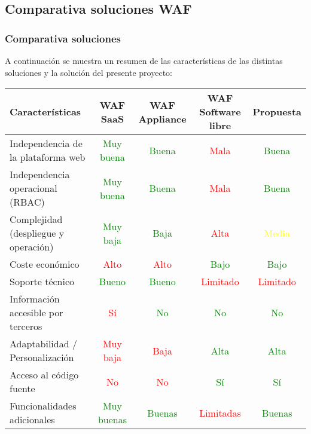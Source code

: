 \subsection{Comparativa soluciones WAF}

\begin{frame}[shrink,c]
  \frametitle{Comparativa soluciones}
  A continuación se muestra un resumen de las características de las distintas soluciones y la solución del presente proyecto:
  \begin{center}
  \resizebox{\linewidth}{!} {
  \begin{tabular}{| l | c | c | c | c |}
    \hline
    {\bf Características}                       &	{\bf WAF SaaS}          & {\bf WAF Appliance} & {\bf WAF Software libre}  & {\bf Propuesta}       \\
    \hline
    Independencia de la plataforma web  & \textcolor{green}{Muy buena}& \textcolor{green}{Buena}& \textcolor{red}{Mala}& \textcolor{green}{Buena}\\
    \hline
    Independencia operacional (RBAC)    & \textcolor{green}{Muy buena}& \textcolor{green}{Buena}& \textcolor{red}{Mala}& \textcolor{green}{Buena}\\
    \hline
    Complejidad (despliegue y operación)& \textcolor{green}{Muy baja}& \textcolor{green}{Baja}& \textcolor{red}{Alta}& \textcolor{yellow}{Media}\\
    \hline
    Coste económico                     & \textcolor{red}{Alto}& \textcolor{red}{Alto}& \textcolor{green}{Bajo}& \textcolor{green}{Bajo}\\
    \hline
    Soporte técnico                     & \textcolor{green}{Bueno}& \textcolor{green}{Bueno}& \textcolor{red}{Limitado}& \textcolor{red}{Limitado}\\
    \hline
    Información accesible por terceros  & \textcolor{red}{Sí}& \textcolor{green}{No}& \textcolor{green}{No}& \textcolor{green}{No}\\ 
    \hline
    Adaptabilidad / Personalización     & \textcolor{red}{Muy baja}& \textcolor{red}{Baja}& \textcolor{green}{Alta}& \textcolor{green}{Alta}\\ 
    \hline
    Acceso al código fuente             & \textcolor{red}{No}& \textcolor{red}{No}& \textcolor{green}{Sí}   & \textcolor{green}{Sí}   \\ 
    \hline
    Funcionalidades adicionales  & \textcolor{green}{Muy buenas}& \textcolor{green}{Buenas}& \textcolor{red}{Limitadas}& \textcolor{green}{Buenas}\\
    \hline
  \end{tabular}}
  \end{center}
\end{frame}

